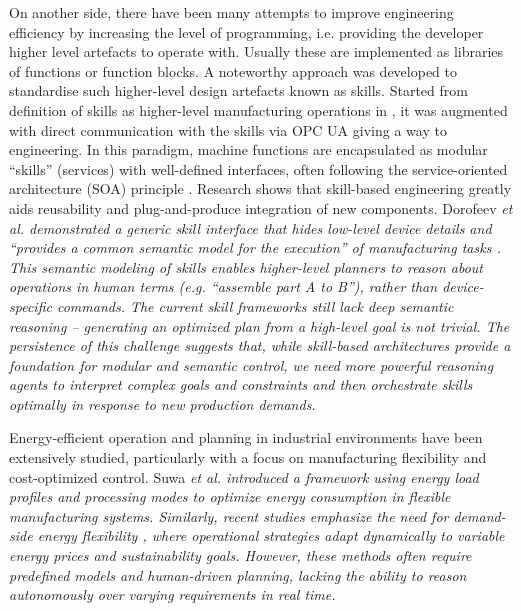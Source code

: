 \documentclass[conference]{IEEEtran}
\newcommand{\etal}{\it et al. \normalfont}
\begin{document}
On another side, there have been many attempts to improve engineering efficiency by increasing the level of programming, i.e. providing the developer higher level artefacts to operate with. Usually these are implemented as libraries of functions or function blocks. A noteworthy approach was developed to standardise such higher-level design artefacts known as skills. Started from definition of skills as higher-level manufacturing operations in \cite{pfrommer2013pprs}, it was augmented with direct communication with the skills via OPC UA giving a way to engineering. In this paradigm, machine functions are encapsulated as modular “skills” (services) with well-defined interfaces, often following the service-oriented architecture (SOA) principle \cite{9576342}. Research shows that skill-based engineering greatly aids reusability and plug-and-produce integration of new components. Dorofeev \etal demonstrated a generic skill interface that hides low-level device details and “provides a common semantic model for the execution” of manufacturing tasks \cite{10.1145/3377812.3381394}. This semantic modeling of skills enables higher-level planners to reason about operations in human terms (e.g. “assemble part A to B”), rather than device-specific commands. The current skill frameworks still lack deep semantic reasoning – generating an optimized plan from a high-level goal is not trivial. The persistence of this challenge suggests that, while skill-based architectures provide a foundation for modular and semantic control, we need more powerful reasoning agents to interpret complex goals and constraints and then orchestrate skills optimally in response to new production demands. 

Energy-efficient operation and planning in industrial environments have been extensively studied, particularly with a focus on manufacturing flexibility and cost-optimized control. Suwa \etal \cite{SUWA2016313} introduced a framework using energy load profiles and processing modes to optimize energy consumption in flexible manufacturing systems. Similarly, recent studies emphasize the need for demand-side energy flexibility \cite{VONHAYN2023155}, where operational strategies adapt dynamically to variable energy prices and sustainability goals. However, these methods often require predefined models and human-driven planning, lacking the ability to reason autonomously over varying requirements in real time.
\end{document}
